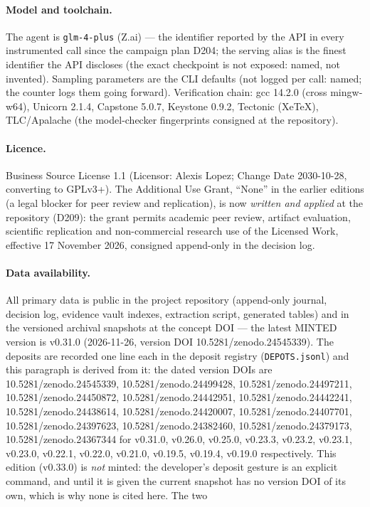 \documentclass[10pt,a4paper]{article}
\newcommand{\code}[1]{\texttt{\small #1}}
\begin{document}
\paragraph{Model and toolchain.} The agent is \code{glm-4-plus}
(Z.ai) --- the identifier reported by the API in every instrumented
call since the campaign plan D204; the serving alias is the finest
identifier the API discloses (the exact checkpoint is not exposed:
named, not invented). Sampling parameters are the CLI defaults (not
logged per call: named; the counter logs them going forward).
Verification chain: gcc 14.2.0 (cross mingw-w64), Unicorn 2.1.4,
Capstone 5.0.7, Keystone 0.9.2, Tectonic (XeTeX), TLC/Apalache (the
model-checker fingerprints consigned at the repository).

\paragraph{Licence.} Business Source License 1.1 (Licensor: Alexis
Lopez; Change Date 2030-10-28, converting to GPLv3+). The Additional
Use Grant, ``None'' in the earlier editions (a legal blocker for peer
review and replication), is now \emph{written and applied} at the
repository (D209): the grant permits academic peer review, artifact
evaluation, scientific replication and non-commercial research use of
the Licensed Work, effective 17 November 2026, consigned append-only
in the decision log.

\paragraph{Data availability.} All primary data is public in the project
repository (append-only journal, decision log, evidence vault indexes,
extraction script, generated tables) and in the versioned archival
snapshots at the concept DOI \doiConcept{} --- the latest MINTED version is
v0.31.0 (2026-11-26, version DOI 10.5281/zenodo.24545339).
The deposits are recorded one line each in the deposit registry
(\code{DEPOTS.jsonl}) and this paragraph is derived from it: the dated
version DOIs are 10.5281/zenodo.24545339, 10.5281/zenodo.24499428, 10.5281/zenodo.24497211, 10.5281/zenodo.24450872, 10.5281/zenodo.24442951, 10.5281/zenodo.24442241, 10.5281/zenodo.24438614, 10.5281/zenodo.24420007, 10.5281/zenodo.24407701, 10.5281/zenodo.24397623, 10.5281/zenodo.24382460, 10.5281/zenodo.24379173, 10.5281/zenodo.24367344
for v0.31.0, v0.26.0, v0.25.0, v0.23.3, v0.23.2, v0.23.1, v0.23.0, v0.22.1, v0.22.0, v0.21.0, v0.19.5, v0.19.4, v0.19.0 respectively. This edition (v0.33.0) is \emph{not}
minted: the developer's deposit gesture is an explicit command, and until
it is given the current snapshot has no version DOI of its own, which is
why none is cited here. The two
\end{document}

